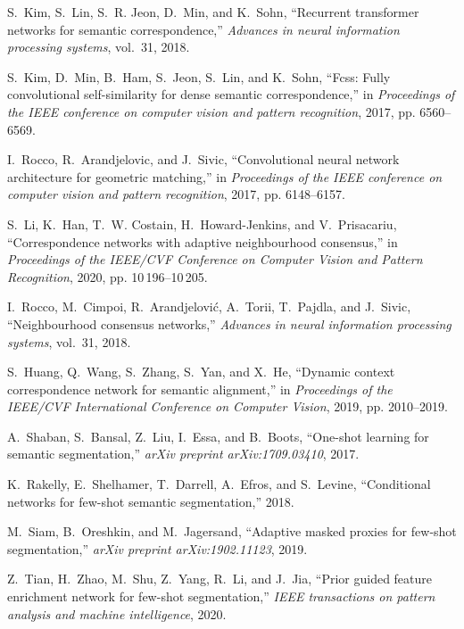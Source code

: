 \documentclass[journal]{IEEEtran}
\begin{document}
\begin{thebibliography}{10}
	S.~Kim, S.~Lin, S.~R. Jeon, D.~Min, and K.~Sohn, ``Recurrent transformer
	networks for semantic correspondence,'' \emph{Advances in neural information
		processing systems}, vol.~31, 2018.
	
	S.~Kim, D.~Min, B.~Ham, S.~Jeon, S.~Lin, and K.~Sohn, ``Fcss: Fully
	convolutional self-similarity for dense semantic correspondence,'' in
	\emph{Proceedings of the IEEE conference on computer vision and pattern
		recognition}, 2017, pp. 6560--6569.
	
	I.~Rocco, R.~Arandjelovic, and J.~Sivic, ``Convolutional neural network
	architecture for geometric matching,'' in \emph{Proceedings of the IEEE
		conference on computer vision and pattern recognition}, 2017, pp. 6148--6157.
	
	S.~Li, K.~Han, T.~W. Costain, H.~Howard-Jenkins, and V.~Prisacariu,
	``Correspondence networks with adaptive neighbourhood consensus,'' in
	\emph{Proceedings of the IEEE/CVF Conference on Computer Vision and Pattern
		Recognition}, 2020, pp. 10\,196--10\,205.
	
	I.~Rocco, M.~Cimpoi, R.~Arandjelovi{\'c}, A.~Torii, T.~Pajdla, and J.~Sivic,
	``Neighbourhood consensus networks,'' \emph{Advances in neural information
		processing systems}, vol.~31, 2018.
	
	S.~Huang, Q.~Wang, S.~Zhang, S.~Yan, and X.~He, ``Dynamic context
	correspondence network for semantic alignment,'' in \emph{Proceedings of the
		IEEE/CVF International Conference on Computer Vision}, 2019, pp. 2010--2019.
	
	A.~Shaban, S.~Bansal, Z.~Liu, I.~Essa, and B.~Boots, ``One-shot learning for
	semantic segmentation,'' \emph{arXiv preprint arXiv:1709.03410}, 2017.
	
	K.~Rakelly, E.~Shelhamer, T.~Darrell, A.~Efros, and S.~Levine, ``Conditional
	networks for few-shot semantic segmentation,'' 2018.
	
	M.~Siam, B.~Oreshkin, and M.~Jagersand, ``Adaptive masked proxies for few-shot
	segmentation,'' \emph{arXiv preprint arXiv:1902.11123}, 2019.
	
	Z.~Tian, H.~Zhao, M.~Shu, Z.~Yang, R.~Li, and J.~Jia, ``Prior guided feature
	enrichment network for few-shot segmentation,'' \emph{IEEE transactions on
		pattern analysis and machine intelligence}, 2020.
	

\end{thebibliography}
\end{document}
